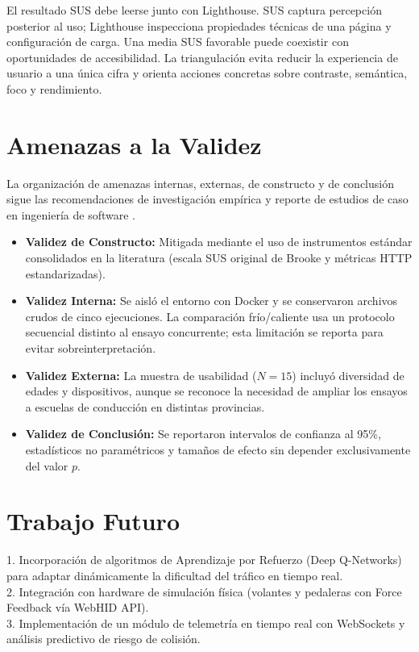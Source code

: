 \documentclass[11pt,a4paper]{report}
\begin{document}
El resultado SUS debe leerse junto con Lighthouse. SUS captura percepción posterior al uso; Lighthouse inspecciona propiedades técnicas de una página y configuración de carga. Una media SUS favorable puede coexistir con oportunidades de accesibilidad. La triangulación evita reducir la experiencia de usuario a una única cifra y orienta acciones concretas sobre contraste, semántica, foco y rendimiento.

\chapter{Amenazas a la Validez}
La organización de amenazas internas, externas, de constructo y de conclusión sigue las recomendaciones de investigación empírica y reporte de estudios de caso en ingeniería de software \cite{runeson2009guidelines}.
\begin{itemize}
    \item \textbf{Validez de Constructo:} Mitigada mediante el uso de instrumentos estándar consolidados en la literatura (escala SUS original de Brooke y métricas HTTP estandarizadas).
    \item \textbf{Validez Interna:} Se aisló el entorno con Docker y se conservaron archivos crudos de cinco ejecuciones. La comparación frío/caliente usa un protocolo secuencial distinto al ensayo concurrente; esta limitación se reporta para evitar sobreinterpretación.
    \item \textbf{Validez Externa:} La muestra de usabilidad ($N=15$) incluyó diversidad de edades y dispositivos, aunque se reconoce la necesidad de ampliar los ensayos a escuelas de conducción en distintas provincias.
    \item \textbf{Validez de Conclusión:} Se reportaron intervalos de confianza al 95\%, estadísticos no paramétricos y tamaños de efecto sin depender exclusivamente del valor $p$.
\end{itemize}

\chapter{Trabajo Futuro}
1. Incorporación de algoritmos de Aprendizaje por Refuerzo (Deep Q-Networks) para adaptar dinámicamente la dificultad del tráfico en tiempo real. \\
2. Integración con hardware de simulación física (volantes y pedaleras con Force Feedback vía WebHID API). \\
3. Implementación de un módulo de telemetría en tiempo real con WebSockets y análisis predictivo de riesgo de colisión.
\end{document}
